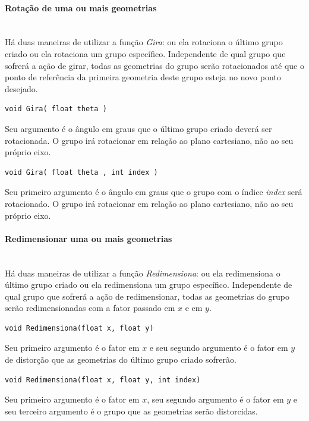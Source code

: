 \paragraph{Rotação de uma ou mais geometrias}\mbox{}\\
Há duas maneiras de utilizar a função \emph{Gira}: ou ela rotaciona o último grupo criado ou ela rotaciona um grupo específico. Independente de qual grupo que sofrerá a ação de girar, todas as geometrias do grupo serão rotacionados até que o ponto de referência da primeira geometria deste grupo esteja no novo ponto desejado.

\begin{lstlisting}
void Gira( float theta )
\end{lstlisting}

Seu argumento é o ângulo em graus que o último grupo criado deverá ser rotacionada. O grupo irá rotacionar em relação ao plano cartesiano, não ao seu próprio eixo. 

\begin{lstlisting}
void Gira( float theta , int index )
\end{lstlisting}
Seu primeiro argumento é o ângulo em graus que o grupo com o índice \emph{index} será rotacionado. O grupo irá rotacionar em relação ao plano cartesiano, não ao seu próprio eixo. 

\paragraph{Redimensionar uma ou mais geometrias}\mbox{}\\
Há duas maneiras de utilizar a função \emph{Redimensiona}: ou ela redimensiona o último grupo criado ou ela redimensiona um grupo específico. Independente de qual grupo que sofrerá a ação de redimensionar, todas as geometrias do grupo serão redimensionadas com a fator passado em $x$ e em $y$.

\begin{lstlisting}
void Redimensiona(float x, float y)
\end{lstlisting}

Seu primeiro argumento é o fator em $x$ e seu segundo argumento é o fator em $y$ de distorção que as geometrias do último grupo criado sofrerão.

\begin{lstlisting}
void Redimensiona(float x, float y, int index)
\end{lstlisting}
Seu primeiro argumento é o fator em $x$, seu segundo argumento é o fator em $y$ e seu terceiro argumento é o grupo que as geometrias serão distorcidas.

